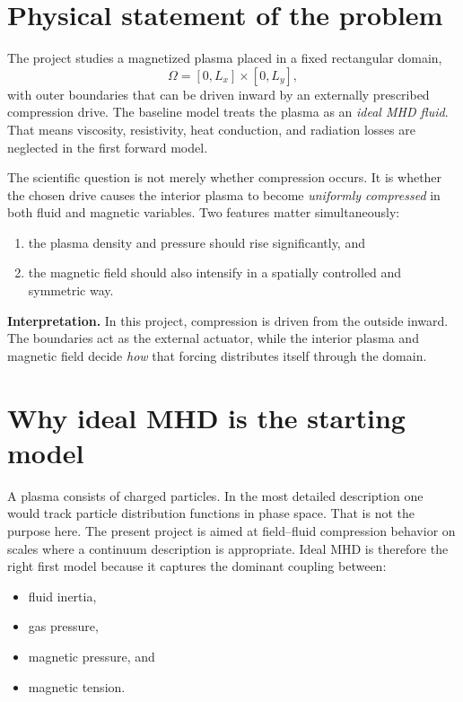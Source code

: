 \documentclass[11pt]{article}
\begin{document}
\section{Physical statement of the problem}
The project studies a magnetized plasma placed in a fixed rectangular domain,
\[
\Omega = [0,L_x]\times[0,L_y],
\]
with outer boundaries that can be driven inward by an externally prescribed compression drive. The baseline model treats the plasma as an \emph{ideal MHD fluid}. That means viscosity, resistivity, heat conduction, and radiation losses are neglected in the first forward model.

The scientific question is not merely whether compression occurs. It is whether the chosen drive causes the interior plasma to become \emph{uniformly compressed} in both fluid and magnetic variables. Two features matter simultaneously:
\begin{enumerate}
    \item the plasma density and pressure should rise significantly, and
    \item the magnetic field should also intensify in a spatially controlled and symmetric way.
\end{enumerate}

\begin{physicsbox}
\textbf{Interpretation.} In this project, compression is driven from the outside inward. The boundaries act as the external actuator, while the interior plasma and magnetic field decide \emph{how} that forcing distributes itself through the domain.
\end{physicsbox}

\section{Why ideal MHD is the starting model}
A plasma consists of charged particles. In the most detailed description one would track particle distribution functions in phase space. That is not the purpose here. The present project is aimed at field--fluid compression behavior on scales where a continuum description is appropriate. Ideal MHD is therefore the right first model because it captures the dominant coupling between:
\begin{itemize}
    \item fluid inertia,
    \item gas pressure,
    \item magnetic pressure, and
    \item magnetic tension.
\end{itemize}
\end{document}
